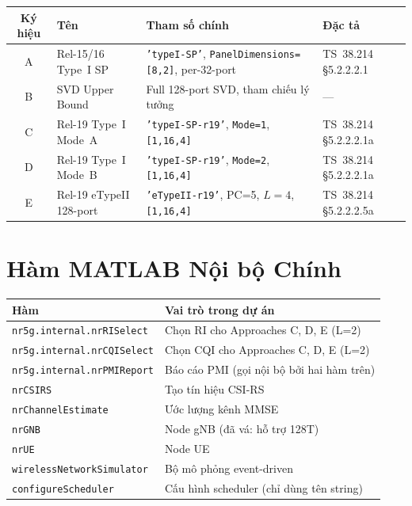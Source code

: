 \documentclass[12pt, a4paper]{article}
\begin{document}
\begin{center}
\begin{tabular}{cL{2.5cm}L{5.5cm}L{3.2cm}}
\toprule
\textbf{Ký hiệu} & \textbf{Tên} & \textbf{Tham số chính} & \textbf{Đặc tả} \\
\midrule
A & Rel-15/16 Type~I SP &
  \texttt{'typeI-SP'}, \texttt{PanelDimensions=[8,2]}, per-32-port &
  TS~38.214 \S5.2.2.2.1 \\[3pt]
B & SVD Upper Bound &
  Full 128-port SVD, tham chiếu lý tưởng &
  --- \\[3pt]
C & Rel-19 Type~I Mode~A &
  \texttt{'typeI-SP-r19'}, \texttt{Mode=1}, \texttt{[1,16,4]} &
  TS~38.214 \S5.2.2.2.1a \\[3pt]
D & Rel-19 Type~I Mode~B &
  \texttt{'typeI-SP-r19'}, \texttt{Mode=2}, \texttt{[1,16,4]} &
  TS~38.214 \S5.2.2.2.1a \\[3pt]
E & Rel-19 eTypeII 128-port &
  \texttt{'eTypeII-r19'}, PC=5, $L=4$, \texttt{[1,16,4]} &
  TS~38.214 \S5.2.2.2.5a \\
\bottomrule
\end{tabular}
\end{center}

\section{Hàm MATLAB Nội bộ Chính}

\begin{center}
\begin{tabular}{L{5.5cm} L{8cm}}
\toprule
\textbf{Hàm} & \textbf{Vai trò trong dự án} \\
\midrule
\texttt{nr5g.internal.nrRISelect}  &
  Chọn RI cho Approaches C, D, E (L=2) \\[3pt]
\texttt{nr5g.internal.nrCQISelect} &
  Chọn CQI cho Approaches C, D, E (L=2) \\[3pt]
\texttt{nr5g.internal.nrPMIReport} &
  Báo cáo PMI (gọi nội bộ bởi hai hàm trên) \\[3pt]
\texttt{nrCSIRS}                   &
  Tạo tín hiệu CSI-RS \\[3pt]
\texttt{nrChannelEstimate}         &
  Ước lượng kênh MMSE \\[3pt]
\texttt{nrGNB}                     &
  Node gNB (đã vá: hỗ trợ 128T) \\[3pt]
\texttt{nrUE}                      &
  Node UE \\[3pt]
\texttt{wirelessNetworkSimulator}  &
  Bộ mô phỏng event-driven \\[3pt]
\texttt{configureScheduler}        &
  Cấu hình scheduler (chỉ dùng tên string) \\
\bottomrule
\end{tabular}
\end{center}
\end{document}
